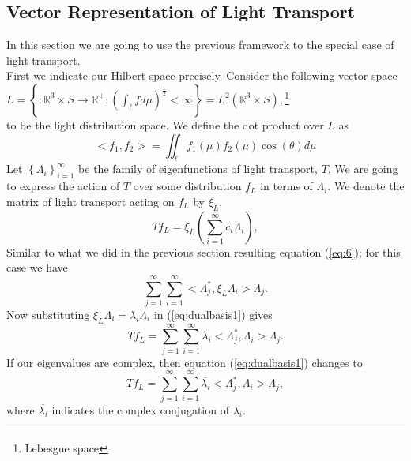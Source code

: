 \documentclass[12pt, letterpaper]{article}
\begin{document}
\subsection{Vector Representation of Light Transport}
\label{subsec:3}
In this section we are going to use the previous framework to the special case of light transport.
\\First we indicate our Hilbert space precisely. Consider the following vector space
$\textit{L}=\left \{:\mathbb{R}^{3}\times S\rightarrow\mathbb{R}^{+}
 : (\int_{\ell}fd\mu)^{\frac{1}{2}} < \infty\right \}=L^{2}(\mathbb{R}^{3}\times S),$\footnote{Lebesgue space}
\\to be the light distribution space. We define the dot product over $\textit{L}$ as
\begin{equation}
    <f_{1},f_{2}>=\iint_{\ell}f_{1}(\mu)f_{2}(\mu)\cos(\theta)d\mu
\end{equation}
Let $\left\{\Lambda_{i}\right\}_{i=1}^{\infty}$ be the family of eigenfunctions of light transport, $T$. We are going to express the action of $T$ over some distribution $f_{L}$ in terms of $\Lambda_{i}$. We denote the matrix of light transport acting on $f_{L}$ by $\xi_{L}$.
\begin{equation}
    Tf_{L}= \xi_{L}(\sum_{i=1}^{\infty}c_{i}\Lambda_{i}),
\end{equation}
Similar to what we did in the previous section resulting equation (\ref{eq:6}); for this case we have
\begin{equation}
\label{eq:dualbasis1} 
\sum_{j=1}^{\infty}\sum_{i=1}^{\infty}<\Lambda_{j}^{*},\xi_{L}\Lambda_{i}> \Lambda_{j}.
\end{equation}
Now substituting $\xi_{L}\Lambda_{i}=\lambda_{i}\Lambda_{i}$ in (\ref{eq:dualbasis1}) gives
\begin{equation}
    Tf_{L}=\sum_{j=1}^{\infty}\sum_{i=1}^{\infty}\lambda_{i}<\Lambda_{j}^{*},\Lambda_{i}> \Lambda_{j}.
\end{equation}
If our eigenvalues are complex, then equation (\ref{eq:dualbasis1}) changes to 
\begin{equation}
\label{eq:dualbasis2}
    Tf_{L}=\sum_{j=1}^{\infty}\sum_{i=1}^{\infty}\overline{\lambda_{i}}<\Lambda_{j}^{*},\Lambda_{i}> \Lambda_{j},
\end{equation}
where $\overline{\lambda_{i}}$ indicates the complex conjugation of $\lambda_{i}$.
\newpage

\end{document}
